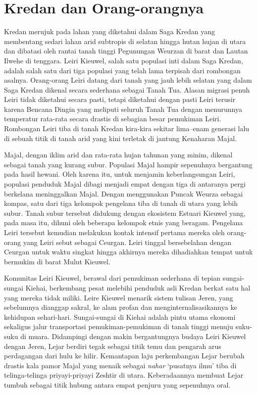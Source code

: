 \documentclass[12pt,oneside]{book}
\begin{document}
\section{Kredan dan Orang-orangnya}
Kredan merujuk pada lahan yang diketahui dalam Saga Kredan yang membentang sedari lahan arid subtropis di selatan hingga hutan hujan di utara dan dibatasi oleh rantai tanah tinggi Pegunungan Weurzan di barat dan Lautan Ilwehe di tenggara. Leiri Kieuwel, salah satu populasi inti dalam Saga Kredan, adalah salah satu dari tiga populasi yang telah lama terpisah dari rombongan asalnya. Orang-orang Leiri datang dari tanah yang jauh lebih selatan yang dalam Saga Kredan dikenal secara sederhana sebagai Tanah Tua. Alasan migrasi penuh Leiri tidak diketahui secara pasti, tetapi diketahui dengan pasti Leiri terusir karena Bencana Dingin yang meliputi seluruh Tanah Tua dengan menurunnya temperatur rata-rata secara drastis di sebagian besar pemukiman Leiri. Rombongan Leiri tiba di tanah Kredan kira-kira sekitar lima--enam generasi lalu di sebuah titik di tanah arid yang kini terletak di jantung Kenaharan Majal.

Majal, dengan iklim arid dan rata-rata hujan tahunan yang minim, dikenal sebagai tanah yang kurang subur. Populasi Majal hampir sepenuhnya bergantung pada hasil hewani. Oleh karena itu, untuk menjamin keberlangsungan Leiri, populasi penduduk Majal dibagi menjadi empat dengan tiga di antaranya pergi berkelana meninggalkan Majal. Dengan menggunakan Puncak Weurza sebagai kompas, satu dari tiga kelompok pengelana tiba di tanah di utara yang lebih subur. Tanah subur tersebut didukung dengan ekosistem Estuari Kieuwel yang, pada masa itu, dihuni oleh beberapa kelompok etnis yang beragam. Pengelana Leiri tersebut kemudian melakukan kontak intensif pertama mereka oleh orang-orang yang Leiri sebut sebagai Ceurgan. Leiri tinggal bersebelahan dengan Ceurgan untuk waktu singkat hingga akhirnya mereka dihadiahkan tempat untuk bermukim di barat Mulut Kieuwel.

Komunitas Leiri Kieuwel, berawal dari pemukiman sederhana di tepian sungai-sungai Kiehai, berkembang pesat melebihi penduduk asli Kredan berkat satu hal yang mereka tidak miliki. Leire Kieuwel menarik sistem tulisan Jeren, yang sebelumnya dianggap sakral, ke alam profan dan menginternalisasikannya ke kehidupan sehari-hari. Sungai-sungai di Kiehai adalah pintu utama ekonomi sekaligus jalur transportasi pemukiman-pemukiman di tanah tinggi menuju suku-suku di muara. Didampingi dengan makin bergantungnya budaya Leiri Kieuwel dengan Jeren, Lejar berdiri tegak sebagai titik temu dan pengarah arus perdagangan dari hulu ke hilir. Kemantapan laju perkembangan Lejar berubah drastis kala pamor Majal yang menaik sebagai \emph{nahar} `pusatnya ilmu' tiba di telinga-telinga priyayi-priyayi Zeshtir di utara. Keberadaannya membuat Lejar tumbuh sebagai titik hubung antara empat penjuru yang sepenuhnya oral. 
\end{document}
